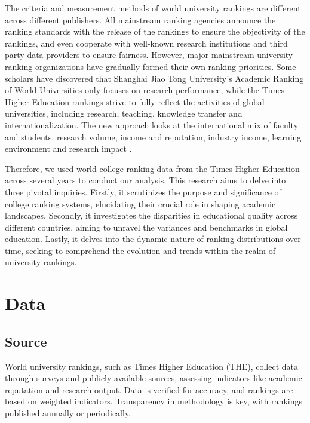 \documentclass[a4paper]{article}
\begin{document}
The criteria and measurement methods of world university rankings are different across different publishers. All mainstream ranking agencies announce the ranking standards with the release of the rankings to ensure the objectivity of the rankings, and even cooperate with well-known research institutions and third party data providers to ensure fairness.  However, major mainstream university ranking organizations have gradually formed their own ranking priorities. Some scholars have discovered that Shanghai Jiao Tong University’s Academic Ranking of World Universities only focuses on research performance\cite{hazelkorn_2013}, while the Times Higher Education rankings strive to fully reflect the activities of global universities, including research, teaching, knowledge transfer and internationalization. The new approach looks at the international mix of faculty and students, research volume, income and reputation, industry income, learning environment and research impact \cite{marope_rankings_2013}.

Therefore, we used world college ranking data from the Times Higher Education across several years to conduct our analysis. This research aims to delve into three pivotal inquiries. Firstly, it scrutinizes the purpose and significance of college ranking systems, elucidating their crucial role in shaping academic landscapes. Secondly, it investigates the disparities in educational quality across different countries, aiming to unravel the variances and benchmarks in global education. Lastly, it delves into the dynamic nature of ranking distributions over time, seeking to comprehend the evolution and trends within the realm of university rankings.



\section*{Data}

\subsection* {Source}

World university rankings, such as Times Higher Education (THE)\cite{education_2016}, collect data through surveys and publicly available sources, assessing indicators like academic reputation and research output. Data is verified for accuracy, and rankings are based on weighted indicators. Transparency in methodology is key, with rankings published annually or periodically.
\end{document}
